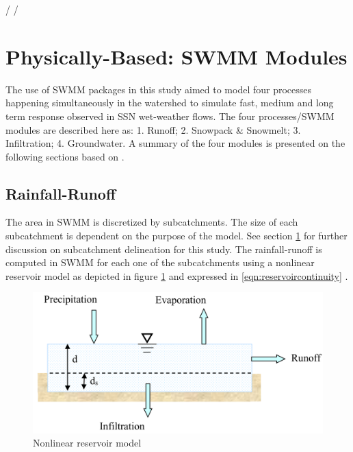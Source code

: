 
/%
/%


\section{Physically-Based: SWMM Modules}

The use of SWMM packages in this study aimed to model four processes happening simultaneously in the watershed to simulate fast, medium and long term response observed in \ac{SSN} wet-weather flows. The four processes/SWMM modules are described here as: 1. Runoff; 2. Snowpack \& Snowmelt; 3. Infiltration; 4. Groundwater. A summary of the four modules is presented on the following sections based on \citet{Rossman2016}. 


\subsection{Rainfall-Runoff} \label{runofflit}

The area in SWMM is discretized by subcatchments. The size of each subcatchment is dependent on the purpose of the model. See section \ref{} for further discussion on subcatchment delineation for this study.
The rainfall-runoff is computed in SWMM for each one of the subcatchments using a nonlinear reservoir model as depicted in figure \ref{fig:runoffreservoir} and expressed in \ref{eqn:reservoircontinuity} \cite{Rossman2016}. 

\begin{figure}[ht]
    \centering
	\includegraphics[scale=0.4]{figures/runoffreservoir.png}
	\caption{Nonlinear reservoir model \cite{Rossman2016}}
	\label{fig:runoffreservoir}
\end{figure}

